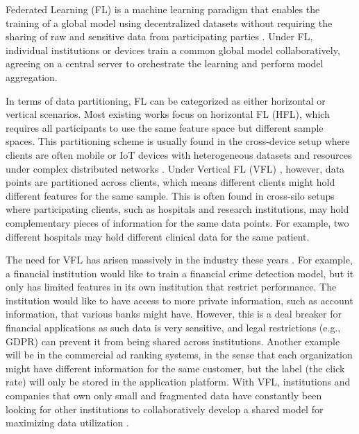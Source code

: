 \documentclass[withindex,glossary,firstyr]{cam-thesis}
\begin{document}
Federated Learning (FL) is a machine learning paradigm that enables the training of a global model using decentralized datasets without requiring the sharing of raw and sensitive data from participating parties \citep{fedavg, fedprox, yang2019federated}. Under FL, individual institutions or devices train a common global model collaboratively, agreeing on a central server to orchestrate the learning and perform model aggregation. 

In terms of data partitioning, FL can be categorized as either horizontal or vertical scenarios. Most existing works focus on horizontal FL (HFL), which requires all participants to use the same feature space but different sample spaces\citep{yang2019federated}. This partitioning scheme is usually found in the cross-device setup where clients are often mobile or IoT devices with heterogeneous datasets and resources under complex distributed networks \citep{yu2021toward, qiu2021zerofl}. Under Vertical FL (VFL) \citep{wei2022vertical}, however, data points are partitioned across clients, which means different clients might hold different features for the same sample. This is often found in cross-silo setups where participating clients, such as hospitals and research institutions, may hold complementary pieces of information for the same data points. For example, two different hospitals may hold different clinical data for the same patient.


The need for VFL has arisen massively in the industry these years \citep{vfl, liu2020asymmetrical}. For example, a financial institution would like to train a financial crime detection model, but it only has limited features in its own institution that restrict performance. The institution would like to have access to more private information, such as account information, that various banks might have. However, this is a deal breaker for financial applications as such data is very sensitive, and legal restrictions (e.g., GDPR) can prevent it from being shared across institutions. Another example will be in the commercial ad ranking systems, in the sense that each organization might have different information for the same customer, but the label (the click rate) will only be stored in the application platform. With VFL, institutions and companies that own only small and fragmented data have constantly been looking for other institutions to collaboratively develop a shared model for maximizing data utilization \citep{li2021survey}. 
\end{document}
